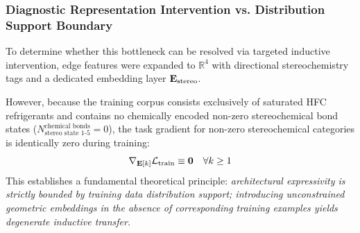 \subsubsection{Diagnostic Representation Intervention vs. Distribution Support Boundary}
To determine whether this bottleneck can be resolved via targeted inductive intervention, edge features were expanded to $\mathbb{R}^4$ with directional stereochemistry tags and a dedicated embedding layer $\mathbf{E}_{\rm stereo}$. 

However, because the training corpus consists exclusively of saturated HFC refrigerants and contains no chemically encoded non-zero stereochemical bond states ($N_{\text{stereo state 1-5}}^{\text{chemical bonds}} = 0$), the task gradient for non-zero stereochemical categories is identically zero during training:
\begin{equation}
    \nabla_{\mathbf{E}[k]} \mathcal{L}_{\rm train} \equiv \mathbf{0} \quad \forall k \ge 1
\end{equation}
This establishes a fundamental theoretical principle: \textit{architectural expressivity is strictly bounded by training data distribution support; introducing unconstrained geometric embeddings in the absence of corresponding training examples yields degenerate inductive transfer.}
